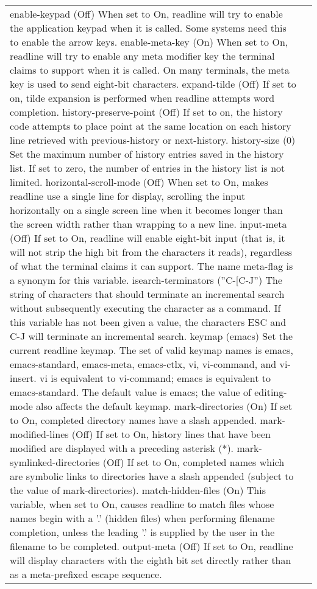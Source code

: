\documentclass[11pt]{article}
\begin{document}
\begin{longtable}{p{}p{}}
{{{enable-keypad (Off)
When set to On, readline will try to enable the application keypad when it is called. Some systems need this to enable the arrow keys.
enable-meta-key (On)
When set to On, readline will try to enable any meta modifier key the terminal claims to support when it is called. On many terminals, the meta key is used to send eight-bit characters.
expand-tilde (Off)
If set to on, tilde expansion is performed when readline attempts word completion.
history-preserve-point (Off)
If set to on, the history code attempts to place point at the same location on each history line retrieved with previous-history or next-history.
history-size (0)
Set the maximum number of history entries saved in the history list. If set to zero, the number of entries in the history list is not limited.
horizontal-scroll-mode (Off)
When set to On, makes readline use a single line for display, scrolling the input horizontally on a single screen line when it becomes longer than the screen width rather than wrapping to a new line.
input-meta (Off)
If set to On, readline will enable eight-bit input (that is, it will not strip the high bit from the characters it reads), regardless of what the terminal claims it can support. The name meta-flag is a synonym for this variable.
isearch-terminators (''C-[C-J'')
The string of characters that should terminate an incremental search without subsequently executing the character as a command. If this variable has not been given a value, the characters ESC and C-J will terminate an incremental search.
keymap (emacs)
Set the current readline keymap. The set of valid keymap names is emacs, emacs-standard, emacs-meta, emacs-ctlx, vi, vi-command, and vi-insert. vi is equivalent to vi-command; emacs is equivalent to emacs-standard. The default value is emacs; the value of editing-mode also affects the default keymap.
mark-directories (On)
If set to On, completed directory names have a slash appended.
mark-modified-lines (Off)
If set to On, history lines that have been modified are displayed with a preceding asterisk (*).
mark-symlinked-directories (Off)
If set to On, completed names which are symbolic links to directories have a slash appended (subject to the value of mark-directories).
match-hidden-files (On)
This variable, when set to On, causes readline to match files whose names begin with a '.' (hidden files) when performing filename completion, unless the leading '.' is supplied by the user in the filename to be completed.
output-meta (Off)
If set to On, readline will display characters with the eighth bit set directly rather than as a meta-prefixed escape sequence.
}}}
\end{longtable}
\end{document}
